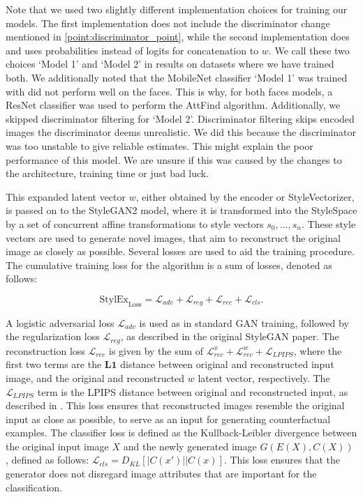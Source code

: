 Note that we used two slightly different implementation choices for training our models. The first implementation does not include the discriminator change mentioned in \ref{point:discriminator_point}, while the second implementation does and uses probabilities instead of logits for concatenation to $w$. We call these two choices `Model 1' and `Model 2' in results on datasets where we have trained both. We additionally noted that the MobileNet classifier `Model 1' was trained with did not perform well on the faces. This is why, for both faces models, a ResNet classifier was used to perform the AttFind algorithm. Additionally, we skipped discriminator filtering for `Model 2'. Discriminator filtering skips encoded images the discriminator deems unrealistic. We did this because the discriminator was too unstable to give reliable estimates. This might explain the poor performance of this model. We are unsure if this was caused by the changes to the architecture, training time or just bad luck.

This expanded latent vector $w$, either obtained by the encoder or StyleVectorizer, is passed on to the StyleGAN2 model, where it is transformed into the StyleSpace by a set of concurrent affine transformations to style vectors $s_{0}, ..., s_{n}$. These style vectors are used to generate novel images, that aim to reconstruct the original image as closely as possible. Several losses are used to aid the training procedure. The cumulative training loss for the algorithm is a sum of losses, denoted as follows:

\begin{equation}
\textrm{StylEx}_\textrm{Loss} = \mathcal{L}_{adv} + \mathcal{L}_{reg} + \mathcal{L}_{rec} + \mathcal{L}_{cls}.
\end{equation}

A logistic adversarial loss \cite{goodfellow2014generative} $\mathcal{L}_{adv}$ is used as in standard GAN training, followed by the regularization loss $\mathcal{L}_{reg}$, as described in the original StyleGAN \cite{karras2020analyzing} paper. The reconstruction loss $\mathcal{L}_{rec}$ is given by the sum of  $\mathcal{L}_{rec}^x + \mathcal{L}_{rec}^w + \mathcal{L}_{LPIPS} $, where the first two terms are the $\mathbf{L1}$ distance between original and reconstructed input image, and the original and reconstructed $w$ latent vector, respectively. The $\mathcal{L}_{LPIPS}$ term is the LPIPS distance between original and reconstructed input, as described in \cite{8578166}. This loss ensures that reconstructed images resemble the original input as close as possible, to serve as an input for generating counterfactual examples. The classifier loss is defined as the Kullback-Leibler divergence between the original input image $X$ and the newly generated image $G(E(X), C(X))$ , defined as follows: $\mathcal{L}_{cls} = D_{KL}[|C(x')||C(x)]$. This loss ensures that the generator does not disregard image attributes that are important for the classification.

